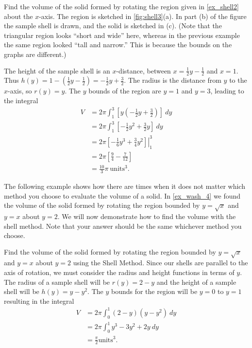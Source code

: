 \begin{example}\label{ex_shell3}
Find the volume of the solid formed by rotating the region given in \autoref{ex_shell2} about the $x$-axis.
\solution
The region is sketched in \autoref{fig:shell3}(a). In part (b) of the figure the sample shell is drawn, and the solid is sketched in (c). (Note that the triangular region looks ``short and wide'' here, whereas in the previous example the same region looked ``tall and narrow.'' This is because the bounds on the graphs are different.)

The height of the sample shell is an $x$-distance, between $x=\frac12y-\frac12$ and $x=1$. Thus $h(y) = 1-(\frac12y-\frac12) = -\frac12y+\frac32.$ The radius is the distance from $y$ to the $x$-axis, so $r(y) =y$. The $y$ bounds of the region are $y=1$ and $y=3$, leading to the integral
\begin{align*}
V &= 2\pi\int_1^3\left[y\left(-\frac12y+\frac32\right)\right]\ dy \\
	&= 2\pi\int_1^3\left[-\frac12y^2+\frac32y\right]\ dy \\
	&= 2\pi\left.\left[-\frac16y^3+\frac34y^2\right]\right|_1^3 \\
	&= 2\pi\left[\frac94-\frac7{12}\right]\\
	&=	\frac{10}{3}\pi %
	\ \text{units}^3.
\end{align*}
\end{example}

The following example shows how there are times when it does not matter which method you choose to evaluate the volume of a solid. In \autoref{ex_wash_4} we found the volume of the solid formed by rotating the region bounded by $y=\sqrt x$ and $y=x$ about $y=2$. We will now demonstrate how to find the volume with the shell method. Note that your answer should be the same whichever method you choose.

\begin{example}\label{ex_shell_wash_eq}
Find the volume of the solid formed by rotating the region bounded by $y=\sqrt x$ and $y=x$ about $y=2$ using the Shell Method.
\solution
Since our shells are parallel to the axis of rotation, we must consider the radius and height functions in terms of $y$. The radius of a sample shell will be $r(y)=2-y$ and the height of a sample shell will be $h(y)=y-y^2$. The $y$ bounds for the region will be $y=0$ to $y=1$ resulting in the integral
\begin{align*}
V&=2\pi \int_0^1 (2-y)(y-y^2)\ dy\\
&=2\pi\int_0^1 y^3-3y^2+2y\ dy\\
&=\frac{\pi}{2} \text{units}^3.
\end{align*}
\end{example}

